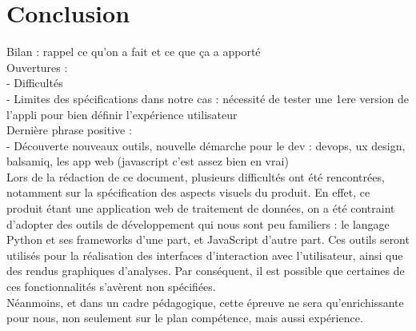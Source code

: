 	\section*{Conclusion}
		Bilan : rappel ce qu'on a fait et ce que ça a apporté\\
		Ouvertures :\\
			- Difficultés\\
			- Limites des spécifications dans notre cas : nécessité de tester une 1ere version de l'appli pour bien définir l'expérience utilisateur\\
		Dernière phrase positive :\\
			- Découverte nouveaux outils, nouvelle démarche pour le dev : devops, ux design, balsamiq, les app web (javascript c'est assez bien en vrai)\\
			
		Lors de la rédaction de ce document, plusieurs difficultés ont été rencontrées, notamment sur la spécification des aspects visuels du produit. En effet, ce produit étant une application web de traitement de données, on a été contraint d'adopter des outils de développement qui nous sont peu familiers : le langage Python et ses frameworks d'une part, et JavaScript d'autre part. Ces outils seront utilisés pour la réalisation des interfaces d'interaction avec l'utilisateur, ainsi que des rendus graphiques d'analyses. Par conséquent, il est possible que certaines de ces fonctionnalités s'avèrent non spécifiées.\\
		Néanmoins, et dans un cadre pédagogique, cette épreuve ne sera qu'enrichissante pour nous, non seulement sur le plan compétence, mais aussi expérience.
		

